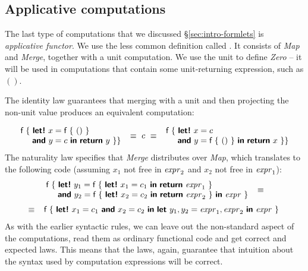 \documentclass[runningheads,a4paper]{llncs}
\begin{document}

\subsection{Applicative computations}
\label{sec:laws-appl}

The last type of computations that we discussed \S\ref{sec:intro-formlets} is \emph{applicative functor}.
We use the less common definition called  \cite{applicative}. It consists of \emph{Map} 
and \emph{Merge}, together with a unit computation. We use the unit to define \emph{Zero} -- it will be 
used in computations that contain some unit-returning expression, such as $()$.

The identity law guarantees that merging with a unit and then projecting the non-unit value
produces an equivalent computation:

\begin{equation*}
\begin{array}{l}
\ident{f}~\{~  \kvd{let!}~x = \ident{f}~\{~()~\}\\
\hspace{1.4em} \kvd{and}~y = c~\kvd{in}~\kvd{return}~y~\}
\}
\end{array}
~\equiv~ c ~\equiv~
\begin{array}{l}
\ident{f}~\{~  \kvd{let!}~x = c\\
\hspace{1.4em} \kvd{and}~y = \ident{f}~\{~()~\}~\kvd{in}~\kvd{return}~x~\}
\}
\end{array}
\end{equation*}
%
The naturality law specifies that \emph{Merge} distributes over \emph{Map}, which translates to
the following code (assuming $x_1$ not free in $\textnormal{\emph{expr}}_2$ and $x_2$ not free in $\textnormal{\emph{expr}}_1$):
%
\begin{equation*}
\begin{array}{c}
\begin{array}{l}
\ident{f}~\{~ \kvd{let!}~y_1 = \ident{f}~\{~\kvd{let!}~x_1 = c_1~\kvd{in}~\kvd{return}~\expr_1 ~\} \\
\hspace{1.40em}   \kvd{and}~y_2 = \ident{f}~\{~\kvd{let!}~x_2 = c_2~\kvd{in}~\kvd{return}~\expr_2 ~\}~\kvd{in}~ \expr~\}
\end{array} ~\equiv~
\\[1.2em]
~\equiv~
\begin{array}{l}
\ident{f}~\{~ \kvd{let!}~x_1 = c_1~\kvd{and}~x_2 = c_2~\kvd{in}~ 
              \kvd{let}~y_1, y_2 = \expr_1, \expr_2~\kvd{in}~ \expr~\}
\end{array}
\end{array}
\end{equation*}
%
As with the earlier syntactic rules, we can leave out the non-standard aspect
of the computations, read them as ordinary functional code and get correct and 
expected laws. This means that the laws, again, guarantee that intuition about the
syntax used by computation expressions will be correct.
\end{document}
